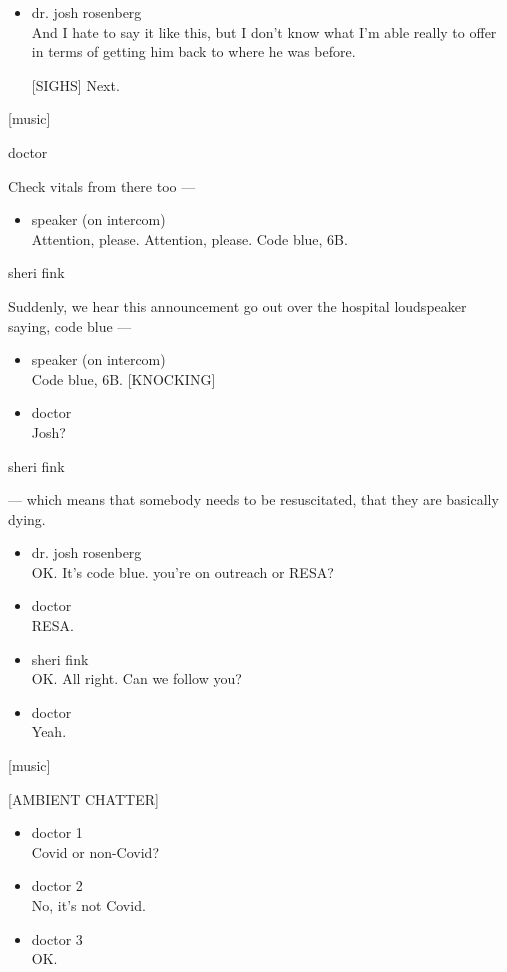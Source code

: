\begin{itemize}
\item
  dr. josh rosenberg\\
  And I hate to say it like this, but I don't know what I'm able really
  to offer in terms of getting him back to where he was before.

  {[}SIGHS{]} Next.
\end{itemize}

{[}music{]}

doctor

Check vitals from there too ---

\begin{itemize}
\tightlist
\item
  speaker (on intercom)\\
  Attention, please. Attention, please. Code blue, 6B.
\end{itemize}

sheri fink

Suddenly, we hear this announcement go out over the hospital loudspeaker
saying, code blue ---

\begin{itemize}
\item
  speaker (on intercom)\\
  Code blue, 6B. {[}KNOCKING{]}
\item
  doctor\\
  Josh?
\end{itemize}

sheri fink

--- which means that somebody needs to be resuscitated, that they are
basically dying.

\begin{itemize}
\item
  dr. josh rosenberg\\
  OK. It's code blue. you're on outreach or RESA?
\item
  doctor\\
  RESA.
\item
  sheri fink\\
  OK. All right. Can we follow you?
\item
  doctor\\
  Yeah.
\end{itemize}

{[}music{]}

{[}AMBIENT CHATTER{]}

\begin{itemize}
\item
  doctor 1\\
  Covid or non-Covid?
\item
  doctor 2\\
  No, it's not Covid.
\item
  doctor 3\\
  OK.
\end{itemize}

